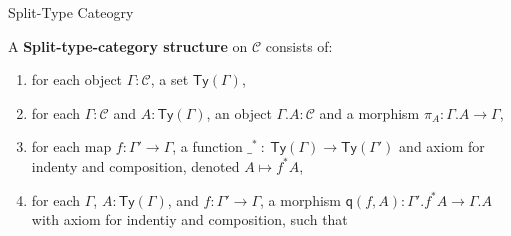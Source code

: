 \documentclass[
  ignorenonframetext,
  aspectratio=169,
  usenames,
  dvipsnames
]{beamer}
\newcounter{saveenumi}
\newcommand{\saveitem}{\setcounter{saveenumi}{\value{enumi}}}
\newcommand{\defemph}[1]{\textbf{#1}}
\newcommand{\constfont}[1]{\ensuremath{\mathsf{#1}}}
\newcommand{\CC}{{\mathcal{C}}}
\newcommand{\Ty}{\constfont{Ty}}
\newcommand{\Tymap}[1]{\ensuremath{\Ty({#1})}}
\newcommand{\compext}[2]{\ensuremath{{#1}.{#2}}}
\newcommand{\deppr}[1]{\constfont{\pi}_{#1}}
\newcommand{\q}{\constfont{q}}
\newcommand{\qmap}[2]{\ensuremath{\q({#1},{#2})}}
\newcommand{\reindex}[2]{\ensuremath{#1^* #2}}
\begin{document}
\begin{frame}{Split-Type Cateogry}
    \begin{definition}
        A \defemph{Split-type-category structure} on $\CC$ consists of:
        \begin{enumerate}
          \item for each object $\Gamma : \CC$, a set $\Tymap{\Gamma}$,
          \item for each $\Gamma : \CC$ and $A : \Tymap{\Gamma}$, an object $\compext{\Gamma}{A} : \CC$
           and a morphism $\deppr{A} : \compext{\Gamma}{A} \to \Gamma$,
          \item for each map $f : \Gamma' \to \Gamma$, a  function $\_^*\ :\ \Tymap{\Gamma} \to \Tymap{\Gamma'}$ and axiom for indenty and composition, denoted $A \mapsto \reindex{f}{A} $,
          \item for each $\Gamma$, $A : \Tymap{\Gamma}$, and $f : \Gamma' \to \Gamma$, a morphism
            $\qmap{f}{A} : \compext{\Gamma'}{\reindex{f}{A}} \to \compext{\Gamma}{A}$ with axiom for indentiy and composition, such that 
            \saveitem
        \end{enumerate}
      \end{definition}  
\end{frame}
\end{document}
